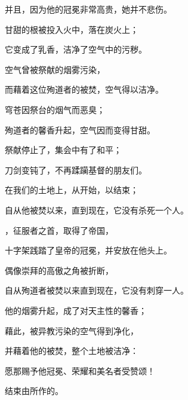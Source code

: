 并且，因为他的冠冕非常高贵，她并不悲伤。\par

甘甜的根被投入火中，落在炭火上；\par

它变成了乳香，洁净了空气中的污秽。\par

空气曾被祭献的烟雾污染，\par

而藉着这位殉道者的被焚，空气得以洁净。\par

穹苍因祭台的烟气而恶臭；\par

殉道者的馨香升起，空气因而变得甘甜。\par

祭献停止了，集会中有了和平；\par

刀剑变钝了，不再蹂躏基督的朋友们。\par

在我们的土地上，从开始，以结束；\par

自从他被焚以来，直到现在，它没有杀死一个人。\par

，征服者之首，取得了帝国，\par

十字架践踏了皇帝的冠冕，并安放在他头上。\par

偶像崇拜的高傲之角被折断，\par

自从殉道者被焚以来直到现在，它没有刺穿一人。\par

他的烟雾升起，成了对天主性的馨香；\par

藉此，被异教污染的空气得到净化，\par

并藉着他的被焚，整个土地被洁净：\par

愿那赐予他冠冕、荣耀和美名者受赞颂！\par

结束由所作的。\par

